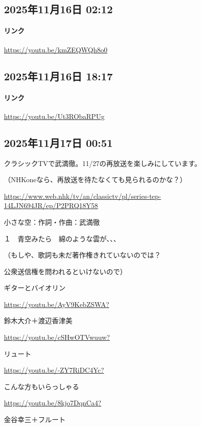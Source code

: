 \subsection*{2025年11月16日 02:12}

\paragraph{リンク}
\url{https://youtu.be/kmZEQWQh8o0}

\subsection*{2025年11月16日 18:17}

\paragraph{リンク}
\url{https://youtu.be/Ut3RObaRPUg}

\subsection*{2025年11月17日 00:51}

クラシックTVで武満徹。11/27の再放送を楽しみにしています。

（NHKoneなら、再放送を待たなくても見られるのかな？）

\url{https://www.web.nhk/tv/an/classictv/pl/series-tep-14LJN694JR/ep/P2PRQ18Y58}

小さな空：作詞・作曲：武満徹

１　青空みたら　綿のような雲が、、、

（もしや、歌詞も未だ著作権きれていないのでは？

公衆送信権を問われるといけないので）

ギターとバイオリン

\url{https://youtu.be/AyV9KebZSWA?}

鈴木大介＋渡辺香津美

\url{https://youtu.be/cSHwOTVwuuw?}

リュート

\url{https://youtu.be/-ZY7RiDC4Yc?}

こんな方もいらっしゃる

\url{https://youtu.be/8kjo7DqnCa4?}

金谷幸三＋フルート

